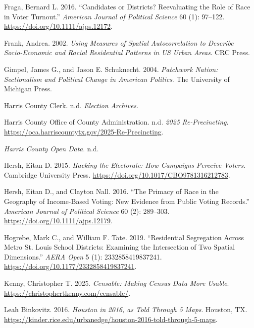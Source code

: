\documentclass[
]{article}
\newlength{\cslhangindent}
\newenvironment{CSLReferences}[2] %
 {\begin{list}{}{%
  \setlength{\itemindent}{0pt}
  \setlength{\leftmargin}{0pt}
  \setlength{\parsep}{0pt}
  \ifodd #1
   \setlength{\leftmargin}{\cslhangindent}
   \setlength{\itemindent}{-1\cslhangindent}
  \fi
  \setlength{\itemsep}{#2\baselineskip}}}
 {\end{list}}
\begin{document}
\begin{CSLReferences}{1}{1}
Fraga, Bernard L. 2016. {``Candidates or Districts? Reevaluating the
Role of Race in Voter Turnout.''} \emph{American Journal of Political
Science} 60 (1): 97--122. \url{https://doi.org/10.1111/ajps.12172}.

Frank, Andrea. 2002. \emph{Using Measures of Spatial Autocorrelation to
Describe Socio-Economic and Racial Residential Patterns in US Urban
Areas}. CRC Press.

Gimpel, James G., and Jason E. Schuknecht. 2004. \emph{Patchwork Nation:
Sectionalism and Political Change in American Politics}. The University
of Michigan Press.

Harris County Clerk. n.d. \emph{Election Archives}.

Harris County Office of County Administration. n.d. \emph{2025
Re-Precincting}.
\url{https://oca.harriscountytx.gov/2025-Re-Precincting}.

\emph{Harris County Open Data}. n.d.

Hersh, Eitan D. 2015. \emph{Hacking the Electorate: How Campaigns
Perceive Voters}. Cambridge University Press.
\url{https://doi.org/10.1017/CBO9781316212783}.

Hersh, Eitan D., and Clayton Nall. 2016. {``The Primacy of Race in the
Geography of Income-Based Voting: New Evidence from Public Voting
Records.''} \emph{American Journal of Political Science} 60 (2):
289--303. \url{https://doi.org/10.1111/ajps.12179}.

Hogrebe, Mark C., and William F. Tate. 2019. {``Residential Segregation
Across Metro St. Louis School Districts: Examining the Intersection of
Two Spatial Dimensions.''} \emph{AERA Open} 5 (1): 2332858419837241.
\url{https://doi.org/10.1177/2332858419837241}.

Kenny, Christopher T. 2025. \emph{Censable: Making Census Data More
Usable}. \url{https://christophertkenny.com/censable/}.

Leah Binkovitz. 2016. \emph{Houston in 2016, as Told Through 5 Maps}.
Houston, TX.
\url{https://kinder.rice.edu/urbanedge/houston-2016-told-through-5-maps}.


\end{CSLReferences}
\end{document}
